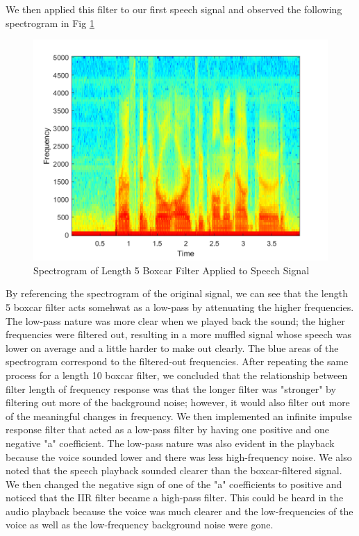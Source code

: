\documentclass[10pt]{article}
\begin{document}
We then applied this filter to our first speech signal and observed the following spectrogram in Fig \ref{fig:Boxcar5Spec}

\begin{centering}
	\begin{figure} [H]
		\centering
		\includegraphics[scale=0.22]{images/lowpassfilter73b.png}
		\caption{Spectrogram of Length 5 Boxcar Filter Applied to Speech Signal}
		\label{fig:Boxcar5Spec}
	\end{figure}
\end{centering}

By referencing the spectrogram of the original signal, we can see that the length 5 boxcar filter acts somehwat as a low-pass by attenuating the higher frequencies. The low-pass nature was more clear when we played back the sound; the higher frequencies were filtered out, resulting in a more muffled signal whose speech was lower on average and a little harder to make out clearly. The blue areas of the spectrogram correspond to the filtered-out frequencies. 
After repeating the same process for a length 10 boxcar filter, we concluded that the relationship between filter length of frequency response was that the longer filter was "stronger" by filtering out more of the background noise; however, it would also filter out more of the meaningful changes in frequency. 
We then implemented an infinite impulse response filter that acted as a low-pass filter by having one positive and one negative "a" coefficient. The low-pass nature was also evident in the playback because the voice sounded lower and there was less high-frequency noise. We also noted that the speech playback sounded clearer than the boxcar-filtered signal. We then changed the negative sign of one of the "a" coefficients to positive and noticed that the IIR filter became a high-pass filter. This could be heard in the audio playback because the voice was much clearer and the low-frequencies of the voice as well as the low-frequency background noise were gone. 
\end{document}
